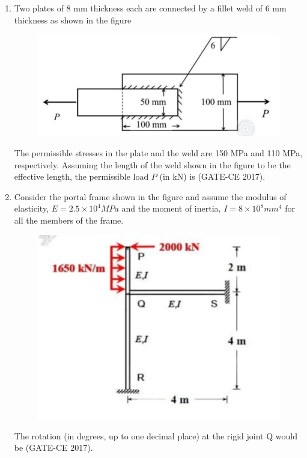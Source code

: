 \documentclass[journal,12pt,onecolumn]{article}
\theoremstyle{remark}
\begin{document}
\begin{enumerate}
    \item Two plates of 8 mm thickness each are connected by a fillet weld of 6 mm thickness as shown in the figure 
    \begin{figure}[H]
    \centering
    \includegraphics[width=0.7\columnwidth]{q41.jpg}  
    \caption{}
    \label{fig:11}
    \end{figure}
    The permissible stresses in the plate and the weld are 150 MPa and 110 MPa, respectively. Assuming the length of the weld shown in the figure to be the effective length, the permissible load $ P $ (in kN) is \underline{\hspace{3cm}} \hfill (GATE-CE 2017).

    \item Consider the portal frame shown in the figure  and assume the modulus of elasticity, $ E = 2.5 \times 10^4 MPa $ and the moment of inertia, $ I = 8 \times 10^8 mm^4 $ for all the members of the frame.
    \begin{figure}[H]
    \centering
    \includegraphics[width=0.7\columnwidth]{q42.jpg}  
    \caption{}
    \label{fig:11}
    \end{figure}
    The rotation (in degrees, up to one decimal place) at the rigid joint Q would be \underline{\hspace{3cm}} \hfill (GATE-CE 2017).


\end{enumerate}
\end{document}
